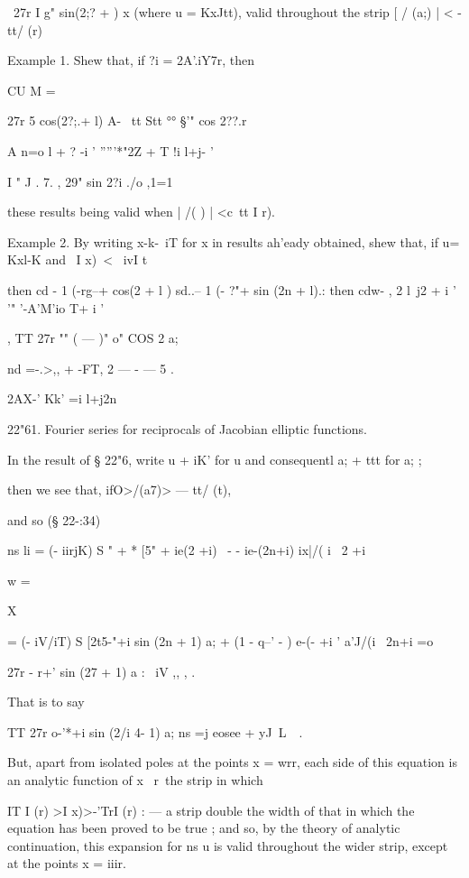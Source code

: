 \  27r I g" sin(2;? +  ) x 
(where u =  KxJtt), valid throughout the strip [ / (a;) | < - tt/ (r) 



Example 1. Shew that, if ?i = 2A'.iY7r, then 

CU M = 



27r   5 cos(2?;.+ l) A- \  tt Stt °° §'" cos 2??.r 

A  n=o l + ?  -i ' '''''*"2Z + T  !i l+j-   ' 

I " J . 7. ,   29" sin 2?i  
./o ,1=1 %

these results being valid when | /( ) | <c\ tt I  r). 

Example 2. By writing x-k-\ iT for x in results ah'eady obtained, shew that, if 
u= Kxl-K and \ I x)\ < \ ivI t\ 

then cd -  1 (-rg--+ cos(2  + l )  sd..--  1 (-  ?"+ sin (2n + l).: 
then cdw- , 2  l\ j2  + i ' '" '-A'M'io T+ i ' 

, TT 27r "" ( — )" o" COS 2 a; 

nd  =-.>,, + -FT, 2   —  -  — 5 . 

2AX-' Kk'  =i l+j2n 

22"61. Fourier series for reciprocals of Jacobian elliptic functions. 

In the result of § 22"6, write u + iK' for u and consequentl   a; +   ttt for a; ; 

then we see that, ifO>/(a7)> — tt/ (t), 

and so (§ 22-:34) 

ns li = (- iirjK) S  " + * [5" + ie(2 +i)   \    -   - ie-(2n+i) ix|/( i \   2 +i  

w = 

X 

= (- iV/iT) S [2t5-"+i sin (2n + 1) a; + (1 - q--' - ) e-(- +i  ' a'J/(i \   2n+i  
 =o 

  27r - r+' sin (27  + 1) a : \  iV  ,,  , .  

That is to say 

TT 27r   o-'*+i sin (2/i 4- 1) a; 
ns =j eosee  + yJ\  L\ \  . 

But, apart from isolated poles at the points x = wrr, each side of this 
equation is an analytic function of x \ r\ the strip in which 

IT I (r) >I x)>-'TrI (r) : 
— a strip double the width of that in which the equation has been proved to 
be true ; and so, by the theory of analytic continuation, this expansion for 
ns u is valid throughout the wider strip, except at the points x = iiir. 



